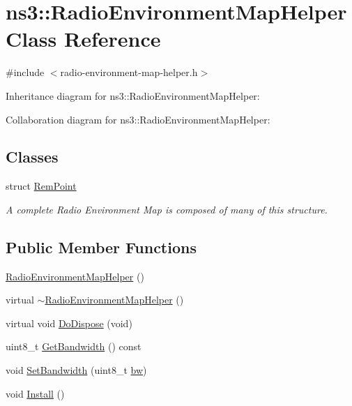 \hypertarget{classns3_1_1RadioEnvironmentMapHelper}{}\section{ns3\+:\+:Radio\+Environment\+Map\+Helper Class Reference}
\label{classns3_1_1RadioEnvironmentMapHelper}


{\ttfamily \#include $<$radio-\/environment-\/map-\/helper.\+h$>$}



Inheritance diagram for ns3\+:\+:Radio\+Environment\+Map\+Helper\+:


Collaboration diagram for ns3\+:\+:Radio\+Environment\+Map\+Helper\+:
\subsection*{Classes}
\begin{DoxyCompactItemize}
\item 
struct \hyperlink{structns3_1_1RadioEnvironmentMapHelper_1_1RemPoint}{Rem\+Point}
\begin{DoxyCompactList}\small\item\em A complete Radio Environment Map is composed of many of this structure. \end{DoxyCompactList}\end{DoxyCompactItemize}
\subsection*{Public Member Functions}
\begin{DoxyCompactItemize}
\item 
\hyperlink{classns3_1_1RadioEnvironmentMapHelper_a8300799eb72fdffdb86a4d46ec58fbbf}{Radio\+Environment\+Map\+Helper} ()
\item 
virtual \hyperlink{classns3_1_1RadioEnvironmentMapHelper_a5aaca22e5333227caed60f79a40c6b5f}{$\sim$\+Radio\+Environment\+Map\+Helper} ()
\item 
virtual void \hyperlink{classns3_1_1RadioEnvironmentMapHelper_a4b7b74285a8f8b43d0632a7499aa22f8}{Do\+Dispose} (void)
\item 
uint8\+\_\+t \hyperlink{classns3_1_1RadioEnvironmentMapHelper_aede732e2c1ffbb548c640ac7fc40bfc4}{Get\+Bandwidth} () const 
\item 
void \hyperlink{classns3_1_1RadioEnvironmentMapHelper_a3818c700f2bc75e39374eff67023eb22}{Set\+Bandwidth} (uint8\+\_\+t \hyperlink{lte__ue__measurements_8m_a3f7228a3941f19f282647a09dd494528}{bw})
\item 
void \hyperlink{classns3_1_1RadioEnvironmentMapHelper_a0b15c982ea80037f9409d73654b48548}{Install} ()
\end{DoxyCompactItemize}
